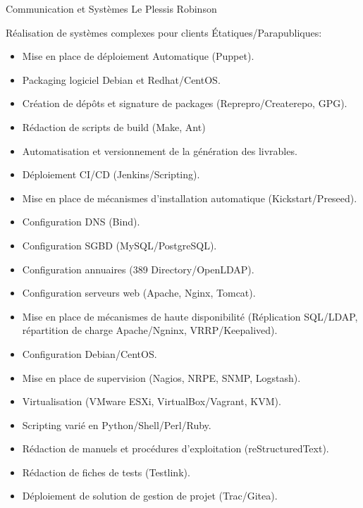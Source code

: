 \documentclass[10pt,a4paper,sans]{moderncv}        %
\begin{document}
        {Communication et Systèmes}
        {Le Plessis Robinson}
        {}
        {Réalisation de systèmes complexes pour clients Étatiques/Parapubliques:
            \begin{itemize}
            \item Mise en place de déploiement Automatique (Puppet).
            \item Packaging logiciel Debian et Redhat/CentOS.
            \item Création de dépôts et signature de packages (Reprepro/Createrepo, GPG).
            \item Rédaction de scripts de build (Make, Ant)
            \item Automatisation et versionnement de la génération des livrables.
            \item Déploiement CI/CD (Jenkins/Scripting).
            \item Mise en place de mécanismes d'installation automatique (Kickstart/Preseed).
            \item Configuration DNS (Bind).
            \item Configuration SGBD (MySQL/PostgreSQL).
            \item Configuration annuaires (389 Directory/OpenLDAP).
            \item Configuration serveurs web (Apache, Nginx, Tomcat).
            \item Mise en place de mécanismes de haute disponibilité (Réplication SQL/LDAP, répartition de charge Apache/Ngninx, VRRP/Keepalived).
            \item Configuration Debian/CentOS.
            \item Mise en place de supervision (Nagios, NRPE, SNMP, Logstash).
            \item Virtualisation (VMware ESXi, VirtualBox/Vagrant, KVM).
            \item Scripting varié en Python/Shell/Perl/Ruby.
            \item Rédaction de manuels et procédures d'exploitation (reStructuredText).
            \item Rédaction de fiches de tests (Testlink).
            \item Déploiement de solution de gestion de projet (Trac/Gitea).
            \end{itemize}
        }
\end{document}
